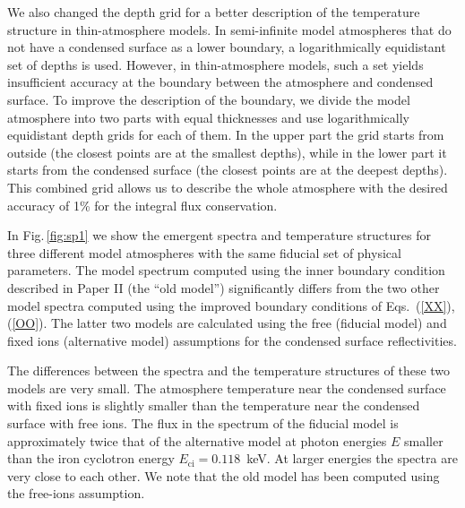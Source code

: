 \documentclass{aa}
\newcommand{\Eci}{E_\mathrm{ci}}
\begin{document}
We also changed the depth grid for a better description
of the temperature structure in thin-atmosphere models. 
In semi-infinite model atmospheres that do not have a 
condensed surface as a lower boundary, a logarithmically
equidistant set of depths is used. However, in thin-atmosphere 
models, such a set yields 
insufficient accuracy at the
boundary between the atmosphere and condensed surface.
To improve the description of the boundary, we divide 
the model atmosphere into two parts with equal thicknesses
and use logarithmically equidistant depth grids for each of
them. In the upper part the grid starts from outside (the
closest points are at the smallest depths), 
while in
the lower part it starts from the condensed surface (the 
closest points are at the deepest depths).
This combined grid allows us to describe the whole
atmosphere with the desired accuracy of 1\% for the
integral flux conservation.

In Fig.\,\ref{fig:sp1} we show the emergent spectra and temperature structures for
three different model atmospheres with the same
fiducial set of physical parameters.  The model spectrum computed
using the inner boundary 
condition described in Paper II (the ``old model'') significantly differs
from the two other model spectra computed using the
improved boundary conditions of Eqs.~(\ref{XX}), (\ref{OO}).
The latter two models are calculated using the
free (fiducial model) and fixed ions (alternative model) 
assumptions for the condensed surface reflectivities.

The differences between the spectra and the temperature
structures of these two models are very small. The
atmosphere temperature near the condensed surface with fixed
ions is slightly smaller than the temperature near the
condensed surface with free ions. The flux in the spectrum
of the fiducial model is  approximately twice that of the
alternative model at photon energies $E$ smaller than the iron
cyclotron energy $\Eci =0.118$~keV. At larger energies
the spectra are very close to each other. We note that the
old model has been computed using the free-ions
assumption.   
\end{document}
